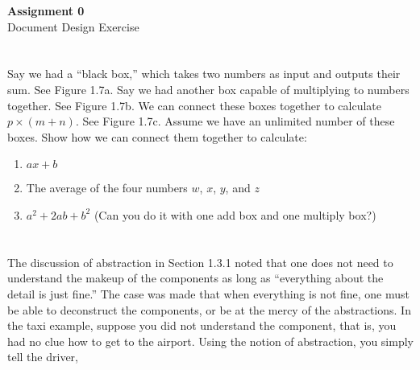 \documentclass[11pt, letterpaper, includehead]{article}
\begin{document}
\pagestyle{fancy}
\fancyhead{}
\fancyhead[R]{\thepage}
\fancyfoot{}


\begin{center}
    \Large{\textbf{Assignment 0}}\\
    \Large{Document Design Exercise}
\end{center}

\section{}
Say we had a ``black box,'' which takes two numbers as input and outputs their sum. See Figure 1.7a. Say we had another box capable of multiplying to numbers together. See Figure 1.7b. We can connect these boxes together to calculate $p \times (m + n)$. See Figure 1.7c. Assume we have an unlimited number of these boxes. Show how we can connect them together to calculate:
\begin{enumerate}[leftmargin=*, label=\textit{\alph*}.]
    \item $ax + b$
    \item The average of the four numbers $w$, $x$, $y$, and $z$
    \item $a^2 + 2ab + b^2$ (Can you do it with one add box and one multiply box?)
\end{enumerate}

\section{}
The discussion of abstraction in Section 1.3.1 noted that one does not need to understand the makeup of the components as long as ``everything about the detail is just fine.'' The case was made that when everything is not fine, one must be able to deconstruct the components, or be at the mercy of the abstractions. In the taxi example, suppose you did not understand the component, that is, you had no clue how to get to the airport. Using the notion of abstraction, you simply tell the driver,
\end{document}
